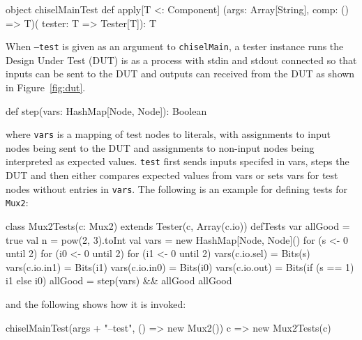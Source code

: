 \documentclass[10pt,twocolumn]{article}
\def\code#1{{\small\tt #1}}
\begin{document}
\begin{scala}
object chiselMainTest {
  def apply[T <: Component]
    (args: Array[String], comp: () => T)(
     tester: T => Tester[T]): T
}
\end{scala}

\noindent
When \code{--test} is given as an argument to \code{chiselMain}, 
a tester instance runs the Design Under Test (DUT) is as a process
with stdin and stdout connected so that inputs can be sent to the DUT and outputs can
received from the DUT as shown in Figure~\ref{fig:dut}.  
\noindent

\begin{scala}
def step(vars: HashMap[Node, Node]): Boolean
\end{scala}

\noindent
where \code{vars} is a mapping of test nodes to literals, 
with assignments to input nodes being sent to the DUT and assignments to
non-input nodes being interpreted as expected values.
\code{test} first sends inputs specifed in vars, steps the DUT and then either
compares expected values from vars or sets vars for test nodes without
entries in \code{vars}.
The following is an example for defining tests for \code{Mux2}:

\begin{scala}
class Mux2Tests(c: Mux2) 
    extends Tester(c, Array(c.io)) {  
  defTests {
    var allGood = true
    val n = pow(2, 3).toInt
    val vars = new HashMap[Node, Node]()
    for (s <- 0 until 2) {
    for (i0 <- 0 until 2) {
    for (i1 <- 0 until 2) {
      vars(c.io.sel) = Bits(s)
      vars(c.io.in1) = Bits(i1)
      vars(c.io.in0) = Bits(i0)
      vars(c.io.out) = Bits(if (s == 1) i1 else i0)
      allGood = step(vars) && allGood
    } } } 
    allGood
  }
}
\end{scala}

\noindent
and the following shows how it is invoked:

\begin{scala}
chiselMainTest(args + "--test", () => new Mux2()){ 
  c => new Mux2Tests(c) 
}
\end{scala}

% 
\end{document}
